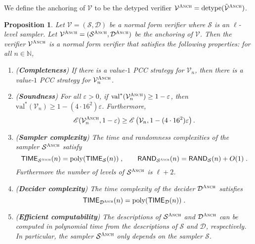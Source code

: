 \documentclass[11pt]{article}
\newtheorem{proposition}[theorem]{Proposition}
\theoremstyle{definition}
\newcommand{\N}{\ensuremath{\mathbb{N}}}
\DeclareMathOperator{\poly}{poly}
\newcommand{\val}{\ensuremath{\mathrm{val}}}
\newcommand{\eps}{\varepsilon}
\newcommand{\sampler}{\mathcal{S}}
\newcommand{\decider}{\mathcal{D}}
\newcommand{\verifier}{\mathcal{V}}
\newcommand{\detype}{\mathrm{detype}}
\newcommand{\gamestyle}[1]{\ensuremath{\textsc{#1}}\xspace}
\newcommand{\Ent}{\mathscr{E}}
\newcommand{\TIME}{\mathsf{TIME}}
\newcommand{\RAND}{\mathsf{RAND}}
\newcommand{\anch}{\gamestyle{Anch}}
\begin{document}
We define the anchoring of $\verifier$ to be the detyped verifier
$\verifier^\anch = \detype(\tilde{\verifier}^\anch)$.

\begin{proposition}
  \label{prop:anchoring}
  Let $\verifier = (\sampler,\decider)$ be a normal form verifier where
  $\sampler$ is an $\ell$-level sampler.
  Let $\verifier^\anch = (\sampler^\anch,\decider^\anch)$ be the anchoring of
  $\verifier$.
  Then the verifier $\verifier^\anch$ is a normal form verifier that satisfies
  the following properties: for all $n \in \N$,
  \begin{enumerate}
  \item \label{enu:anch-completeness} (\textbf{Completeness}) If there is a
    value-$1$ PCC strategy for $\verifier_n$, then there is a value-$1$ PCC
    strategy for $\verifier^\anch_n$.
  \item \label{enu:anch-soundness} (\textbf{Soundness}) For all $\eps > 0$, if
    $\val^*(\verifier^\anch_n) \geq 1 - \eps$, then $\val^*(\verifier_n) \geq 1
    - (4 \cdot 16^2) \eps$.
    Furthermore,
    \[
      \Ent(\verifier^\anch_n,1 - \eps) \geq \Ent \left (\verifier_n, 1 - (4
        \cdot 16^2) \eps \right).
    \]
  \item \label{enu:anch-sampler-complexity} (\textbf{Sampler complexity}) The
    time and randomness complexities of the sampler $\sampler^\anch$ satisfy
    \[
      \TIME_{\sampler^\anch}(n) = \poly(\TIME_\sampler(n))\;, \qquad
      \RAND_{\sampler^\anch}(n) = \RAND_\sampler(n) + O(1)\;.
    \]
    Furthermore the number of levels of $\sampler^\anch$ is $\ell + 2$.
  \item \label{enu:anch-decider-complexity} (\textbf{Decider complexity}) The
    time complexity of the decider $\decider^\anch$ satisfies
    \[
      \TIME_{\decider^\anch}(n) = \poly(\TIME_\decider(n))\;.
    \]
  \item \label{enu:anch-efficient-computability} (\textbf{Efficient
      computability}) The descriptions of $\sampler^\anch$ and $\decider^\anch$
    can be computed in polynomial time from the descriptions of $\sampler$ and
    $\decider$, respectively.
    In particular, the sampler $\sampler^\anch$ only depends on the sampler
    $\sampler$.
  \end{enumerate}
\end{proposition}
\end{document}
